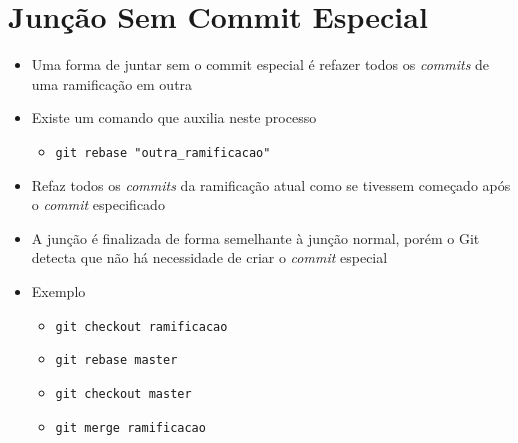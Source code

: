 \documentclass{beamer}
\newenvironment{slide}{\begin{frame}{\insertsection}}{\end{frame}}
\begin{document}
\section{Junção Sem Commit Especial}
\begin{slide}
    \begin{itemize}
        \item Uma forma de juntar sem o commit especial é refazer todos os
            \emph{commits} de uma ramificação em outra
        \pause
        \item Existe um comando que auxilia neste processo
        \begin{itemize}
            \pause
            \item \texttt{git rebase "outra\_ramificacao"}
        \end{itemize}
        \pause
        \item Refaz todos os \emph{commits} da ramificação atual como se
            tivessem começado após o \emph{commit} especificado
        \pause
        \item A junção é finalizada de forma semelhante à junção normal, porém o
            Git detecta que não há necessidade de criar o \emph{commit} especial
        \pause
        \item Exemplo
        \begin{itemize}
            \pause
            \item \texttt{git checkout ramificacao}
            \pause
            \item \texttt{git rebase master}
            \pause
            \item \texttt{git checkout master}
            \pause
            \item \texttt{git merge ramificacao}
        \end{itemize}
    \end{itemize}
\end{slide}
\end{document}
